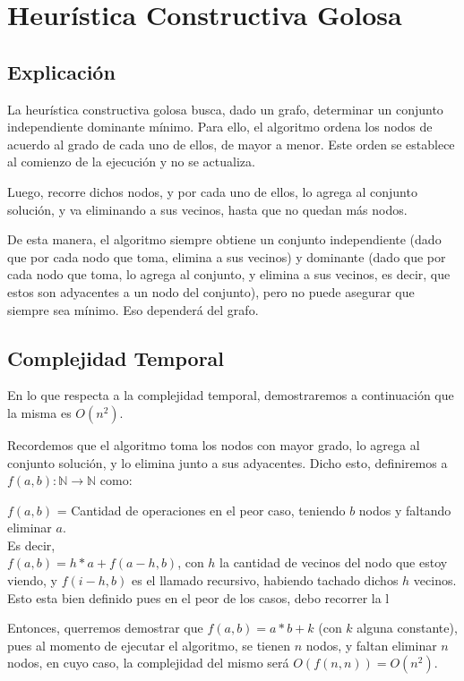 \section{Heur\'istica Constructiva Golosa} \label{ej3}
\subsection{Explicaci\'on}
La heurística constructiva golosa busca, dado un grafo, determinar un conjunto independiente dominante mínimo. 
Para ello, el algoritmo ordena los nodos de acuerdo al grado de cada uno de ellos, de mayor a menor. Este orden se establece al comienzo de la ejecución y no se actualiza.

Luego, recorre dichos nodos, y por cada uno de ellos, lo agrega al conjunto solución, y va eliminando a sus vecinos, hasta que no quedan más nodos.

De esta manera, el algoritmo siempre obtiene un conjunto independiente (dado que por cada nodo que toma, elimina a sus vecinos) y dominante (dado que por cada nodo que toma, lo agrega al conjunto, y elimina a sus vecinos, es decir, que estos son adyacentes a un nodo del conjunto), pero no puede asegurar que siempre sea mínimo. Eso dependerá del grafo.
\subsection{Complejidad Temporal}
En lo que respecta a la complejidad temporal, demostraremos a continuación que la misma es $O(n^{2})$.

Recordemos que el algoritmo toma los nodos con mayor grado, lo agrega al conjunto solución, y lo elimina junto a sus adyacentes.
Dicho esto, definiremos a $f(a,b): \mathbb{N} \rightarrow \mathbb{N}$ como:

$f(a,b)$ = Cantidad de operaciones en el peor caso, teniendo $b$ nodos y faltando eliminar $a$.\\
Es decir,\\
$f(a,b) = h*a + f(a-h,b)$, con $h$ la cantidad de vecinos del nodo que estoy viendo, y $f(i-h,b)$ es el llamado recursivo, habiendo tachado dichos $h$ vecinos. Esto esta bien definido pues en el peor de los casos, debo recorrer la l

Entonces, querremos demostrar que $f(a,b) = a*b + k$ (con $k$ alguna constante), pues al momento de ejecutar el algoritmo, se tienen $n$ nodos, y faltan eliminar $n$ nodos, en cuyo caso, la complejidad del mismo será $O(f(n,n)) = O(n^{2})$.\\

